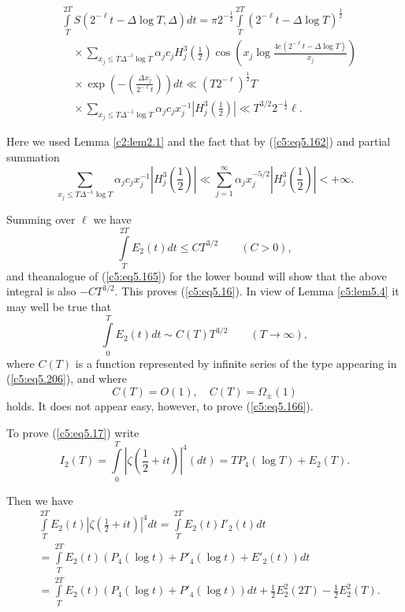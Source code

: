\begin{align*}
& \int\limits^{2T}_T S \left(2^{-\ell} t - \Delta \log T, \Delta\right) dt = 
\pi 2^{-\frac{1}{2}} \int\limits^{2T}_T \left(2^{-\ell} t - \Delta \log
T\right)^{\frac{1}{2}}\\  
& \quad\times \sum\limits_{x_j \leq T \Delta^{-t} \log T} \alpha_j c_j
H^3_j \left(\frac{1}{2} \right) \cos \left(x_j \log \frac{4e (2^{-\ell
  }t -\Delta \log T)}{x_j} \right)\\  
&\quad\times \exp \left(- \left(\frac{\Delta   x_j}{2^{-\ell}t}
\right) \right) dt  
\ll (T2^{-\ell})^{\frac{1}{2}} T\\ 
&\quad\times\sum\limits_{x_j \leq T \Delta^{-1} \log T} \alpha_j c_j
x_j^{-1} \left|H^3_j \left(\frac{1}{2} \right)\right| \ll 
T^{3/2} 2^{-\frac{1}{2}} \ell.  
\end{align*}
 
Here we used Lemma \ref{c2:lem2.1} and the fact that by
(\ref{c5:eq5.162}) and partial summation 
$$ 
\sum\limits_{x_j \leq T \Delta^{-1} \log T } \alpha_j c_j x^{-1}_j
\left| H^3_j \left(\frac{1}{2} \right)\right| \ll 
\sum\limits^{\infty}_{j=1} \alpha_j x^{-5/2}_j \left|
H^3_j \left(\frac{1}{2} \right)\right| <  + \infty. 
$$

Summing over $\ell$ we have
$$
\int\limits^{2T}_T E_2 (t) dt \leq CT^{3/2} \qquad (C>0),
$$
and the\pageoriginale analogue of (\ref{c5:eq5.165}) for the lower
bound will show that the above integral is also $-CT^{3/2}$. This
proves (\ref{c5:eq5.16}). In view of Lemma \ref{c5:lem5.4} it may well
be true that  
\begin{equation}
\int\limits^{T}_0 E_2 (t) dt \sim C (T) T^{3/2} \qquad   (T \to
\infty),\label{c5:eq5.166} 
\end{equation}
where $C(T)$ is a function represented by infinite series of the type
appearing in (\ref{c5:eq5.206}), and where  
$$
C(T) = O(1), \quad C(T) = \Omega_{\pm}(1)
$$
holds. It does not appear easy, however, to prove (\ref{c5:eq5.166}). 

To prove (\ref{c5:eq5.17}) write 
$$
I_2(T) = \int\limits^T_0 \left|\zeta \left(\frac{1}{2} + it \right) 
\right|^4(dt)= TP_4 (\log T) + E_2 (T).  
$$

Then we have 
\begin{align*}
& \int\limits^{2T}_T E_2 (t)\left| \zeta \left(\frac{1}{2} + it
\right)\right |^4 dt = \int\limits^{2T}_T E_2 (t) I'_2(t) dt \\
& = \int\limits^{2T}_T E_2 (t) \left(P_4 (\log t) + P'_4 (\log t) +
E'_2 (t)\right) dt\\ 
& = \int\limits^{2T}_T E_2 (t) \left(P_4 (\log t) + P'_4 (\log
t)\right) 
dt + \frac{1}{2} E^2_2 (2T) - \frac{1}{2} E^2_2(T). 
\end{align*}


